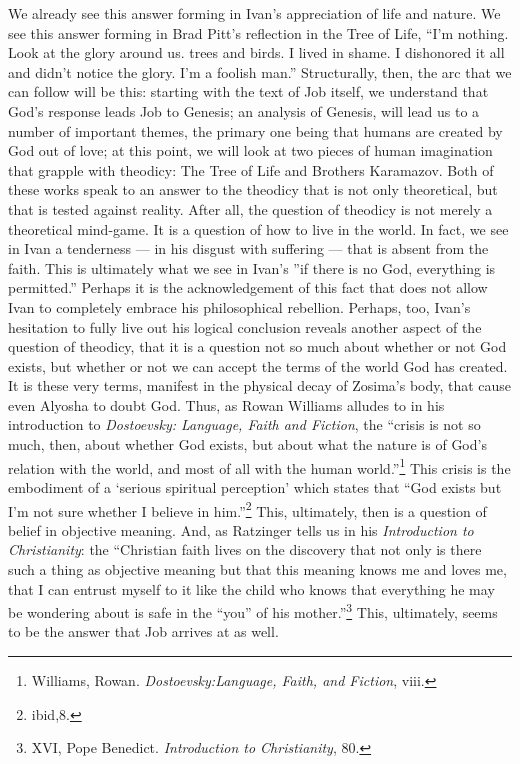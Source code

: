 We already see this answer forming in Ivan's appreciation of life and nature. We see this answer forming in Brad Pitt's reflection in the Tree of Life, ``I'm nothing. Look at the glory around us. trees and birds. I lived in shame. I dishonored it all and didn't notice the glory. I'm a foolish man.'' Structurally, then, the arc that we can follow will be this: starting with the text of Job itself, we understand that God's response leads Job to Genesis; an analysis of Genesis, will lead us to a number of important themes, the primary one being that humans are created by God out of love; at this point, we will look at two pieces of human imagination that grapple with theodicy: The Tree of Life and Brothers Karamazov. Both of these works speak to an answer to the theodicy that is not only theoretical, but that is tested against reality. After all, the question of theodicy is not merely a theoretical mind-game. It is a question of how to live in the world. In fact, we see in Ivan a tenderness --- in his disgust with suffering --- that is absent from the faith. This is ultimately what we see in Ivan's ''if there is no God, everything is permitted.'' Perhaps it is the acknowledgement of this fact that does not allow Ivan to completely embrace his philosophical rebellion. Perhaps, too, Ivan's hesitation to fully live out his logical conclusion reveals another aspect of the question of theodicy, that it is a question not so much about whether or not God exists, but whether or not we can accept the terms of the world God has created. It is these very terms, manifest in the physical decay of Zosima's body, that cause even Alyosha to doubt God. Thus, as Rowan Williams alludes to in his introduction to \emph{Dostoevsky: Language, Faith and Fiction}, the ``crisis is not so much, then, about whether God exists, but about what the nature is of God's relation with the world, and most of all with the human world.''\footnote{Williams, Rowan. \emph{Dostoevsky:Language, Faith, and Fiction}, viii.} This crisis is the embodiment of a `serious spiritual perception' which states that ``God exists but I'm not sure whether I believe in him.''\footnote{ibid,8.}
This, ultimately, then is a question of belief in objective meaning. And, as Ratzinger tells us in his \emph{Introduction to Christianity}: the ``Christian faith lives on the discovery that not only is there such a thing as objective meaning but that this meaning knows me and loves me, that I can entrust myself to it like the child who knows that everything he may be wondering about is safe in the ``you'' of his mother.''\footnote{XVI, Pope Benedict. \emph{Introduction to Christianity}, 80.} This, ultimately, seems to be the answer that Job arrives at as well.
